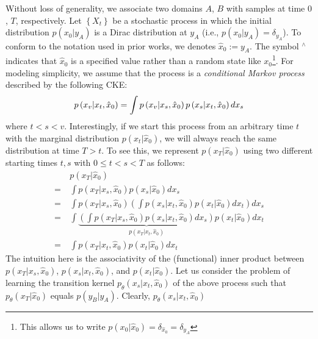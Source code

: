 Without loss of generality, we associate two domains $A$, $B$ with
samples at time $0$, $T$, respectively. Let $\left\{ X_{t}\right\} $
be a stochastic process in which the initial distribution $p\left(x_{0}|y_{A}\right)$
is a Dirac distribution at $y_{A}$ (i.e., $p\left(x_{0}|y_{A}\right)=\delta_{y_{A}}$).
To conform to the notation used in prior works, we denotes $\hat{x}_{0}:=y_{A}$.
The symbol $^{\wedge}$ indicates that $\hat{x}_{0}$ is a specified
value rather than a random state like $x_{0}$\footnote{This allows us to write $p\left(x_{0}|\hat{x}_{0}\right)=\delta_{\hat{x}_{0}}=\delta_{y_{A}}$}.
For modeling simplicity, we assume that the process is a \emph{conditional
Markov process} described by the following CKE:
\begin{equation}
p\left(x_{v}|x_{t},\hat{x}_{0}\right)=\int p\left(x_{v}|x_{s},\text{\ensuremath{\hat{x}_{0}}}\right)p\left(x_{s}|x_{t},\text{\ensuremath{\hat{x}_{0}}}\right)dx_{s}\label{eq:bridge_CKE}
\end{equation}
where $t<s<v$. Interestingly, if we start this process from an arbitrary
time $t$ with the marginal distribution $p\left(x_{t}|\hat{x}_{0}\right)$,
we will always reach the same distribution at time $T>t$. To see
this, we represent $p\left(x_{T}|\hat{x}_{0}\right)$ using two different
starting times $t,s$ with $0\leq t<s<T$ as follows:
\begin{align}
 & p\left(x_{T}|\hat{x}_{0}\right)\nonumber \\
=\  & \int p\left(x_{T}|x_{s},\hat{x}_{0}\right)p\left(x_{s}|\hat{x}_{0}\right)dx_{s}\\
=\  & \int p\left(x_{T}|x_{s},\hat{x}_{0}\right)\left(\int p\left(x_{s}|x_{t},\hat{x}_{0}\right)p\left(x_{t}|\hat{x}_{0}\right)dx_{t}\right)dx_{s}\\
=\  & \int\underbrace{\left(\int p\left(x_{T}|x_{s},\hat{x}_{0}\right)p\left(x_{s}|x_{t},\hat{x}_{0}\right)dx_{s}\right)}_{p\left(x_{T}|x_{t},\hat{x}_{0}\right)}p\left(x_{t}|\hat{x}_{0}\right)dx_{t}\\
=\  & \int p\left(x_{T}|x_{t},\hat{x}_{0}\right)p\left(x_{t}|\hat{x}_{0}\right)dx_{t}
\end{align}
The intuition here is the associativity of the (functional) inner
product between $p\left(x_{T}|x_{s},\hat{x}_{0}\right)$, $p\left(x_{s}|x_{t},\hat{x}_{0}\right)$,
and $p\left(x_{t}|\hat{x}_{0}\right)$. Let us consider the problem
of learning the transition kernel $p_{\theta}\left(x_{s}|x_{t},\hat{x}_{0}\right)$
of the above process such that $p_{\theta}\left(x_{T}|\hat{x}_{0}\right)$
equals $p\left(y_{B}|y_{A}\right)$. Clearly, $p_{\theta}\left(x_{s}|x_{t},\hat{x}_{0}\right)$
